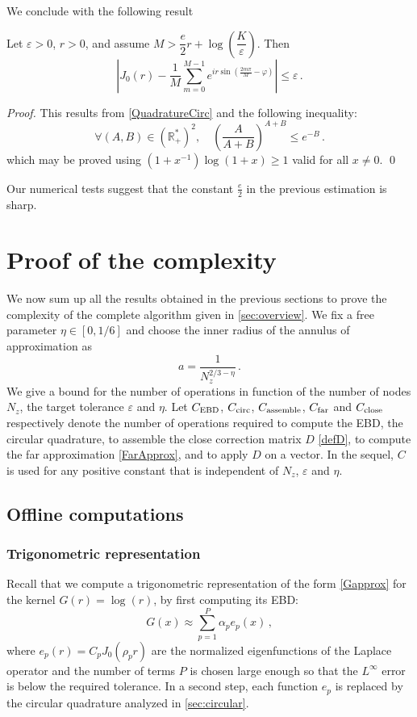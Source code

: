 \documentclass[main]{subfiles}
\begin{document}
We conclude with the following result
\begin{proposition} Let $\varepsilon >0$, $r>0$, and assume $M > \dfrac{e}{2}r + \log\left(\dfrac{K}{\varepsilon}\right)$. Then 
	\[\left|J_0(r) -  \dfrac{1}{M}\sum_{m=0}^{M-1}e^{ir\sin\left(\frac{2m\pi}{M}-\varphi\right)} \right| \leq \varepsilon\,.\]
	\label{suboptCirc}
\end{proposition}
\begin{proof}
	This results from \autoref{QuadratureCirc} and the following inequality:
	\[ \forall (A,B) \in \left(\mathbb{R}_+^*\right)^2, \quad  \left( \dfrac{A}{A+B}\right)^{A+B} \leq e^{-B}\,.\]
	which may be proved using $\left(1+x^{-1}\right)\log(1+x) \geq 1$ valid for all $x \neq 0$. 
	\qed
\end{proof}
Our numerical tests suggest that the constant $\frac{e}{2}$ in the previous estimation is sharp. 


\section{Proof of the complexity}
\label{sec:complexities}
We now sum up all the results obtained in the previous sections to prove the complexity of the complete algorithm given in \autoref{sec:overview}. We fix a free parameter $\eta \in [0,1/6]$ and choose the inner radius of the annulus of approximation as
\begin{equation}
\label{def_a}
a = \dfrac{1}{N_z^{2/3 - \eta}}\,.
\end{equation}  
We give a bound for the number of operations in function of the number of nodes $N_z$, the target tolerance $\varepsilon$ and $\eta$. Let  $C_{\textup{EBD}}$, $C_{\textup{circ}}$, $C_{\textup{assemble}}$, $C_{\textup{far}}$ and $C_{\textup{close}}$ respectively denote the number of operations required  to compute the EBD, the circular quadrature, to assemble the close correction matrix $D$ \eqref{defD}, to compute the far approximation \eqref{FarApprox}, and to apply $D$ on a vector. In the sequel, $C$ is used for any positive constant that is independent of $N_z$, $\varepsilon$ and $\eta$. 
\subsection{Offline computations}
\subsubsection{Trigonometric representation}	
Recall that we compute a trigonometric representation of the form \eqref{Gapprox} for the kernel $G(r) =\log(r)$, by first computing its EBD:
\[ G(x) \approx \sum_{p=1}^P \alpha_p e_p(x)\,,\]
where $e_p(r) = C_p J_0(\rho_p r)$ are the normalized eigenfunctions of the Laplace operator and the number of terms $P$ is chosen large enough so that the $L^\infty$ error is below the required tolerance. In a second step, each function $e_p$ is replaced by the circular quadrature analyzed in \autoref{sec:circular}. 
\end{document}
